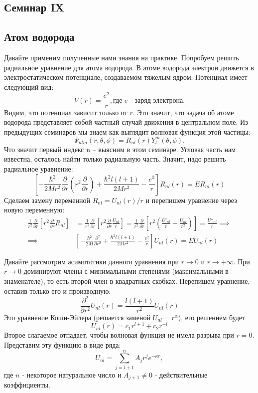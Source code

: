 \begin{center}
    \section{Семинар IX}
\end{center}
\subsection{Атом водорода}
\hspace{1em} Давайте применим полученные нами знания на практике. Попробуем решить радиальное уравнение для атома водорода. В атоме водорода электрон движется в электростатическом потенциале, создаваемом тяжелым ядром. Потенциал имеет следующий вид:
\[
V(r) = \frac{e^2}{r}, \text{где $e$ - заряд электрона}.
\]
Видим, что потенциал зависит только от $r$. Это значит, что задача об атоме водорода представляет собой частный случай движения в центральном поле. Из предыдущих семинаров мы знаем как выглядит волновая функция этой частицы:
\[
\Psi_{nlm}(r, \theta, \phi) = R_{nl}(r)Y^m_l(\theta, \phi).
\]
Что значит первый индекс n -- выясним в этом семинаре. Угловая часть нам известна, осталось найти только радиальную часть. Значит, надо решить радиальное уравнение:
\[
\left[ -\frac{\hbar^2}{2Mr^2}\frac{\partial}{\partial r}(r^2 \frac{\partial}{\partial r}) + \frac{\hbar^2 l(l+1)}{2Mr^2} - \frac{e^2}{r}\right]R_{nl}(r) = ER_{nl}(r)
\]
Сделаем замену переменной $R_{nl}=U_{nl}(r)/r$ и перепишем уравнение через новую переменную:
\begin{align*}
\frac{1}{r^2}\frac{\partial}{\partial r}\left[ r^2 \frac{\partial}{\partial r} R_{nl} \right] &= \frac{1}{r^2}\frac{\partial}{\partial r}\left[ r^2 \frac{\partial}{\partial r} \frac{U_{nl}}{r} \right] = \frac{1}{r^2}\frac{\partial}{\partial r}\left[ r^2 \left(\frac{U'_{nl}}{r} - \frac{U_{nl}}{r^2}\right) \right] = \frac{U''_{nl}}{r} \implies \\
\implies  &\left[ -\frac{\hbar^2}{2M}\frac{\partial^2}{\partial r^2} + \frac{\hbar^2 l(l+1)}{2Mr^2} - \frac{e^2}{r}\right]U_{nl}(r) = EU_{nl}(r)
\end{align*}

Давайте рассмотрим асимптотики данного уравнения при $r \rightarrow 0$ и $r \rightarrow +\infty$. При $r \rightarrow 0$ доминируют члены с минимальными степенями (максимальными в знаменателе), то есть второй член в квадратных скобках. Перепишем уравнение, оставив только его и производную:
\[
\frac{\partial^2}{\partial r^2} U_{nl}(r) = \frac{l(l+1)}{r^2} U_{nl}(r)
\]
Это уравнение Коши-Эйлера (решается заменой $U_{nl} = r^\alpha$), его решением будет
\[
U_{nl}(r) = c_1r^{l+1} + c_2 r^{-l}
\]
Второе слагаемое отпадает, чтобы волновая функция не имела разрыва при $r = 0$. Представим эту функцию в виде ряда:
\[
U_{nl} = \sum\limits_{j=l+1}^{n}A_j r^j e^{-\kappa r},
\]
где $n$ - некоторое натуральное число и $A_{j+1} \neq 0$ - действительные коэффициенты. 

